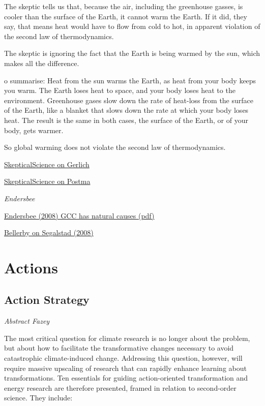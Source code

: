 \documentclass[
]{book}
\begin{document}
The skeptic tells us that, because the air, including the greenhouse gasses, is cooler than the surface of the Earth, it cannot warm the Earth. If it did, they say, that means heat would have to flow from cold to hot, in apparent violation of the second law of thermodynamics.

The skeptic is ignoring the fact that the Earth is being warmed by the sun, which makes all the difference.

o summarise: Heat from the sun warms the Earth, as heat from your body keeps you warm. The Earth loses heat to space, and your body loses heat to the environment. Greenhouse gases slow down the rate of heat-loss from the surface of the Earth, like a blanket that slows down the rate at which your body loses heat. The result is the same in both cases, the surface of the Earth, or of your body, gets warmer.

So global warming does not violate the second law of thermodynamics.

\href{https://skepticalscience.com/Second-law-of-thermodynamics-greenhouse-theory.htm}{SkepticalScience on Gerlich}

\href{https://skepticalscience.com/postma-disproved-the-greenhouse-effect.htm}{SkepticalScience on Postma}

\emph{Endersbee}

\href{pdf/Endersbee_2008_GCC_has_natural_causes.pdf}{Endersbee (2008) GCC has natural causes (pdf)}

\href{https://forskning.no/klima-kronikk/kronikk-co2-okningen-er-ikke-naturlig/1183609}{Bellerby on Segalstad (2008)}

\hypertarget{part-actions}{%
\part{Actions}\label{part-actions}}

\hypertarget{action-strategy}{%
\chapter{Action Strategy}\label{action-strategy}}

\emph{Abstract Fazey}

The most critical question for climate research is no longer about the problem,
but about how to facilitate the transformative changes necessary to avoid
catastrophic climate-induced change.
Addressing this question, however, will require massive upscaling of research
that can rapidly enhance learning about transformations.
Ten essentials for guiding action-oriented transformation and energy research are therefore presented,
framed in relation to second-order science.
They include:
\end{document}
